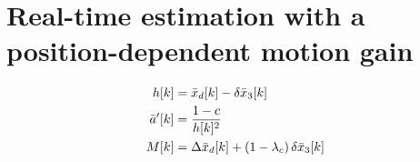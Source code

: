 \clearpage
\section{Real-time estimation with a position-dependent motion gain}

\[
\begin{aligned}
h[k] &= \bar{x}_d[k] - \delta\bar{x}_3[k] \\
\bar{a}'[k] &= \frac{1 - c}{h[k]^{2}} \\
M[k] &= \Delta\bar{x}_d[k] + (1-\lambda_c)\,\delta\bar{x}_3[k]
\end{aligned}
\]

